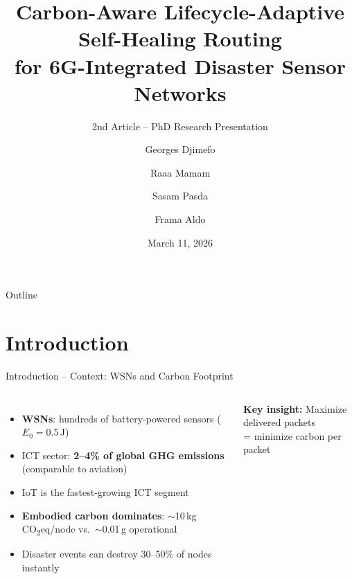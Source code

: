 \documentclass[aspectratio=169, 11pt]{beamer}
\title[CALASH]{Carbon-Aware Lifecycle-Adaptive Self-Healing Routing\\for 6G-Integrated Disaster Sensor Networks}
\subtitle{2nd Article -- PhD Research Presentation}
\author[G.~Djimefo]{Georges Djimefo \and Raaa Mamam \and Sasam Pasda \and Frama Aldo}
\institute{Polytechnique Montr\'{e}al -- LARIM}
\date{March 11, 2026}
\newcommand{\CO}{CO\textsubscript{2}}
\begin{document}
\begin{frame}[plain]
\titlepage
\end{frame}

\begin{frame}{Outline}
\tableofcontents
\end{frame}

\section{Introduction}

\begin{frame}{Introduction -- Context: WSNs and Carbon Footprint}
\begin{columns}[T]
\begin{itemize}
    \item \textbf{WSNs}: hundreds of battery-powered sensors ($E_0 = 0.5$\,J)
    \item ICT sector: \textbf{2--4\% of global GHG emissions} (comparable to aviation)
    \item IoT is the fastest-growing ICT segment
    \item \textbf{Embodied carbon dominates}: $\sim$10\,kg\,\CO eq/node vs.\ $\sim$0.01\,g operational
    \item Disaster events can destroy 30--50\% of nodes instantly
\end{itemize}
\centering
{}

\vspace{3mm}
\textbf{Key insight:} Maximize delivered packets\\= minimize carbon per packet
\end{columns}
\end{frame}
\end{document}
